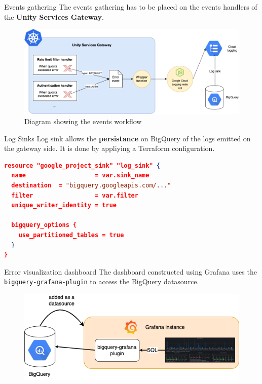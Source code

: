 \documentclass[10pt]{beamer}
\begin{document}
\begin{frame}{Events gathering}
    The events gathering has to be placed on the events handlers of the \textbf{Unity Services Gateway}.
    
    \begin{figure}
        \centering
        \includegraphics[scale=0.3]{src/thesis/img/technical-solution/events-gathering.png}
        \caption{Diagram showing the events workflow}
        \label{fig:my_label}
    \end{figure}
\end{frame}

\begin{frame}[fragile]{Log Sinks}
    Log sink allows the \textbf{persistance} on BigQuery of the logs emitted on the gateway side. It is done by appliying a Terraform configuration.
    \vspace{0.5cm}
    
    \begin{lstlisting}[language=json,firstnumber=1]
resource "google_project_sink" "log_sink" {
  name                   = var.sink_name
  destination  = "bigquery.googleapis.com/..."
  filter                 = var.filter
  unique_writer_identity = true

  bigquery_options {
    use_partitioned_tables = true
  }
}
    \end{lstlisting}
\end{frame}

\begin{frame}{Error visualization dashboard}
    The dashboard constructed using Grafana uses the \texttt{bigquery-grafana-plugin} to access the BigQuery datasource.
    \vspace{0.5cm}
    
    \begin{figure}
        \centering
        \includegraphics[scale=0.4]{src/thesis/img/technical-solution/grafana-connection.png}
    \end{figure}
\end{frame}
\end{document}
